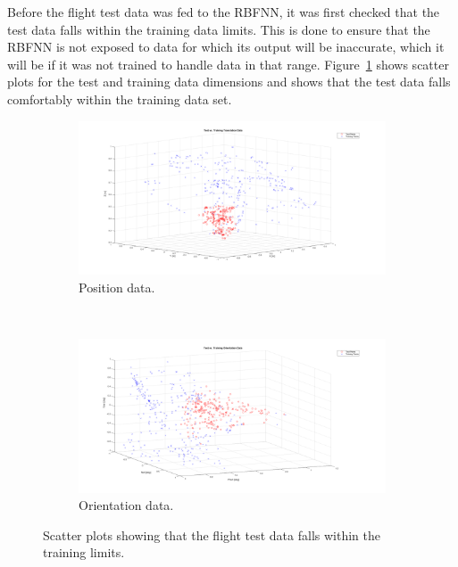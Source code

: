 Before the flight test data was fed to the RBFNN, it was first checked that the test data falls within the training data limits. This is done to ensure that the RBFNN is not exposed to data for which its output will be inaccurate, which it will be if it was not trained to handle data in that range. Figure~\ref{fig:chap5-ts-tr-scatter} shows scatter plots for the test and training data dimensions and shows that the test data falls comfortably within the training data set. 

\begin{figure}
  \centering
  \begin{subfigure}{0.9\textwidth}
    \includegraphics[clip, trim = 120 40 120 0, width=\textwidth]{figures/chapter5/ts_v_tr_pos}
    \caption{Position data.}
  \end{subfigure}
  ~
  \begin{subfigure}{0.9\textwidth}
    \includegraphics[clip, trim = 120 40 120 0, width=\textwidth]{figures/chapter5/ts_v_tr_orient}
    \caption{Orientation data.}
  \end{subfigure}
  \caption[Scatter plots of flight data vs.\ training data. ]{Scatter plots showing that the flight test data falls within the training limits. }
  \label{fig:chap5-ts-tr-scatter}
\end{figure}

